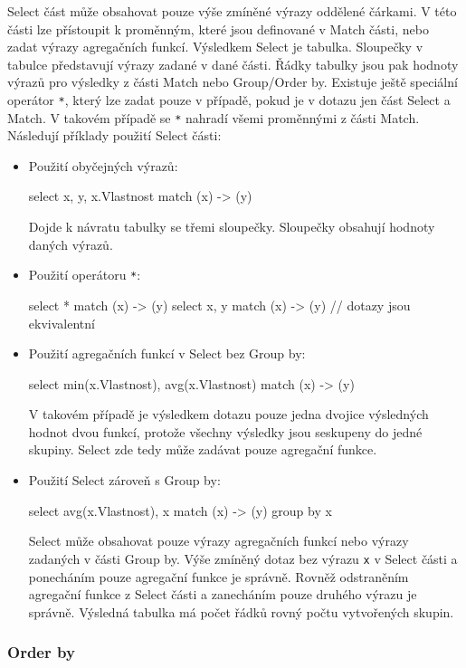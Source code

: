Select část může obsahovat pouze výše zmíněné výrazy oddělené čárkami.
V této části lze přístoupit k proměnným, které jsou definované v Match části, nebo zadat výrazy agregačních funkcí.
Výsledkem Select je tabulka.
Sloupečky v tabulce představují výrazy zadané v dané části.
Řádky tabulky jsou pak hodnoty výrazů pro výsledky z části Match nebo Group/Order by.
Existuje ještě speciální operátor \texttt{*}, který lze zadat pouze v případě, pokud je v dotazu jen část Select a Match.
V takovém případě se \texttt{*} nahradí všemi proměnnými z části Match.
Následují příklady použití Select části:
\begin{itemize}
\item
Použití obyčejných výrazů:
\begin{code}
select x, y, x.Vlastnost match (x) -> (y)
\end{code}
Dojde k návratu tabulky se třemi sloupečky.
Sloupečky obsahují hodnoty daných výrazů.

\item
Použití operátoru \texttt{*}:
\begin{code}
select * match (x) -> (y)
select x, y match (x) -> (y) 
// dotazy jsou ekvivalentní
\end{code} 

\item
Použití agregačních funkcí v Select bez Group by:
\begin{code}
select min(x.Vlastnost), avg(x.Vlastnost) match (x) -> (y)
\end{code}
V takovém případě je výsledkem dotazu pouze jedna dvojice výsledných hodnot dvou funkcí, protože všechny výsledky jsou seskupeny do jedné skupiny.
Select zde tedy může zadávat pouze agregační funkce.

\item
Použití Select zároveň s Group by:
\begin{code}
select avg(x.Vlastnost), x match (x) -> (y) group by x
\end{code}
Select může obsahovat pouze výrazy agregačních funkcí nebo výrazy zadaných v části Group by.
Výše zmíněný dotaz bez výrazu \texttt{x} v Select části a ponecháním pouze agregační funkce je správně.
Rovněž odstraněním agregační funkce z Select části a zanecháním pouze druhého výrazu je správně.
Výsledná tabulka má počet řádků rovný počtu vytvořených skupin.
\end{itemize}

\subsubsection{Order by}

